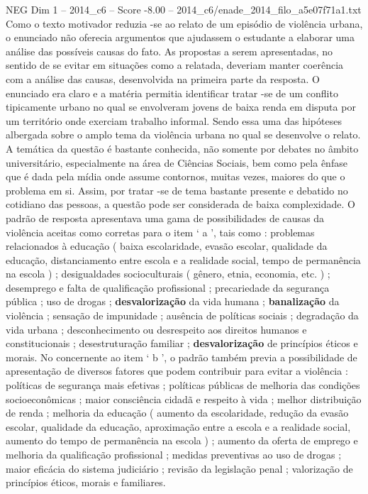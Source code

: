 \begin{textsample}{NEG Dim 1 – 2014\_c6 – Score -8.00 – 2014\_c6/enade\_2014\_filo\_a5e07f71a1.txt}
Como o texto motivador reduzia -se ao relato de um episódio de violência urbana, o enunciado não oferecia argumentos que ajudassem o estudante a elaborar uma análise das possíveis causas do fato.
As propostas a serem apresentadas, no sentido de se evitar em situações como a relatada, deveriam manter coerência com a análise das causas, desenvolvida na primeira parte da resposta.
O enunciado era claro e a matéria permitia identificar tratar -se de um conflito tipicamente urbano no qual se envolveram jovens de baixa renda em disputa por um território onde exerciam trabalho informal.
Sendo essa uma das hipóteses albergada sobre o amplo tema da violência urbana no qual se desenvolve o relato.
A temática da questão é bastante conhecida, não somente por debates no âmbito universitário, especialmente na área de Ciências Sociais, bem como pela ênfase que é dada pela mídia onde assume contornos, muitas vezes, maiores do que o problema em si.
Assim, por tratar -se de tema bastante presente e debatido no cotidiano das pessoas, a questão pode ser considerada de baixa complexidade.
O padrão de resposta apresentava uma gama de possibilidades de causas da violência aceitas como corretas para o item ‘ a ’, tais como : problemas relacionados à educação ( baixa escolaridade, evasão escolar, qualidade da educação, distanciamento entre escola e a realidade social, tempo de permanência na escola ) ; desigualdades socioculturais ( gênero, etnia, economia, etc. ) ; desemprego e falta de qualificação profissional ; precariedade da segurança pública ; uso de drogas ; \textbf{desvalorização} da vida humana ; \textbf{banalização} da violência ; sensação de impunidade ; ausência de políticas sociais ; degradação da vida urbana ; desconhecimento ou desrespeito aos direitos humanos e constitucionais ; desestruturação familiar ; \textbf{desvalorização} de princípios éticos e morais.
No concernente ao item ‘ b ’, o padrão também previa a possibilidade de apresentação de diversos fatores que podem contribuir para evitar a violência : políticas de segurança mais efetivas ; políticas públicas de melhoria das condições socioeconômicas ; maior consciência cidadã e respeito à vida ; melhor distribuição de renda ; melhoria da educação ( aumento da escolaridade, redução da evasão escolar, qualidade da educação, aproximação entre a escola e a realidade social, aumento do tempo de permanência na escola ) ; aumento da oferta de emprego e melhoria da qualificação profissional ; medidas preventivas ao uso de drogas ; maior eficácia do sistema judiciário ; revisão da legislação penal ; valorização de princípios éticos, morais e familiares.

\end{textsample}
